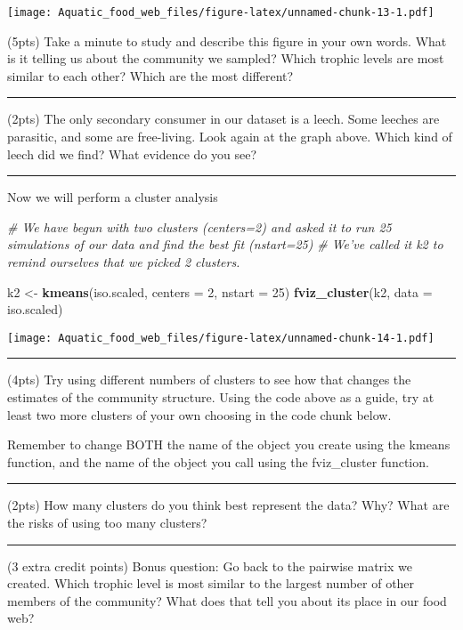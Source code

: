 \documentclass[]{article}
\newenvironment{Shaded}{\begin{snugshade}}{\end{snugshade}}
\newcommand{\KeywordTok}[1]{\textcolor[rgb]{0.13,0.29,0.53}{\textbf{#1}}}
\newcommand{\DataTypeTok}[1]{\textcolor[rgb]{0.13,0.29,0.53}{#1}}
\newcommand{\DecValTok}[1]{\textcolor[rgb]{0.00,0.00,0.81}{#1}}
\newcommand{\StringTok}[1]{\textcolor[rgb]{0.31,0.60,0.02}{#1}}
\newcommand{\CommentTok}[1]{\textcolor[rgb]{0.56,0.35,0.01}{\textit{#1}}}
\newcommand{\NormalTok}[1]{#1}
\begin{document}
\texttt{[image: Aquatic\_food\_web\_files/figure-latex/unnamed-chunk-13-1.pdf]}

(5pts) Take a minute to study and describe this figure in your own
words. What is it telling us about the community we sampled? Which
trophic levels are most similar to each other? Which are the most
different?

\begin{center}\rule{0.5\linewidth}{\linethickness}\end{center}

(2pts) The only secondary consumer in our dataset is a leech. Some
leeches are parasitic, and some are free-living. Look again at the graph
above. Which kind of leech did we find? What evidence do you see?

\begin{center}\rule{0.5\linewidth}{\linethickness}\end{center}

Now we will perform a cluster analysis

\begin{Shaded}
\begin{Highlighting}[]
\CommentTok{# We have begun with two clusters (centers=2) and asked it to run 25 simulations of our data and find the best fit (nstart=25)}
\CommentTok{# We've called it k2 to remind ourselves that we picked 2 clusters.}

\NormalTok{k2 <-}\StringTok{ }\KeywordTok{kmeans}\NormalTok{(iso.scaled, }\DataTypeTok{centers =} \DecValTok{2}\NormalTok{, }\DataTypeTok{nstart =} \DecValTok{25}\NormalTok{)}
\KeywordTok{fviz_cluster}\NormalTok{(k2, }\DataTypeTok{data =}\NormalTok{ iso.scaled)}
\end{Highlighting}
\end{Shaded}

\texttt{[image: Aquatic\_food\_web\_files/figure-latex/unnamed-chunk-14-1.pdf]}

\begin{center}\rule{0.5\linewidth}{\linethickness}\end{center}

(4pts) Try using different numbers of clusters to see how that changes
the estimates of the community structure. Using the code above as a
guide, try at least two more clusters of your own choosing in the code
chunk below.

Remember to change BOTH the name of the object you create using the
kmeans function, and the name of the object you call using the
fviz\_cluster function.

\begin{center}\rule{0.5\linewidth}{\linethickness}\end{center}

(2pts) How many clusters do you think best represent the data? Why? What
are the risks of using too many clusters?

\begin{center}\rule{0.5\linewidth}{\linethickness}\end{center}

(3 extra credit points) Bonus question: Go back to the pairwise matrix
we created. Which trophic level is most similar to the largest number of
other members of the community? What does that tell you about its place
in our food web?
\end{document}
